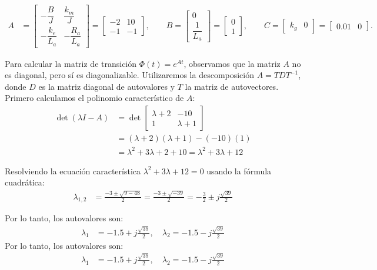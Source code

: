 \documentclass[
  11pt,
  letterpaper,
   addpoints,
  answers
  ]{exam}
\begin{document}
\begin{solution}
\begin{align}
A&=
\begin{bmatrix}
-\dfrac{B}{J} & \dfrac{k_m}{J}\\[4pt]
-\dfrac{k_e}{L_a} & -\dfrac{R_a}{L_a}
\end{bmatrix}
=
\begin{bmatrix}
-2 & 10\\
-1 & -1
\end{bmatrix},\qquad
B=
\begin{bmatrix}
0\\[2pt] \dfrac{1}{L_a}
\end{bmatrix}
=
\begin{bmatrix}
0\\ 1
\end{bmatrix},\qquad
C=\begin{bmatrix} k_g & 0\end{bmatrix}=\begin{bmatrix}0.01 & 0\end{bmatrix}.
\end{align}

Para calcular la matriz de transición $\Phi(t) = e^{At}$, observamos que la matriz $A$ no es diagonal, pero sí es diagonalizable. Utilizaremos la descomposición $A=TDT^{-1}$, donde $D$ es la matriz diagonal de autovalores y $T$ la matriz de autovectores. Primero calculamos el polinomio característico de $A$:
\begin{align}
\det(\lambda I-A) &= \det\begin{bmatrix} \lambda+2 & -10 \\ 1 & \lambda+1 \end{bmatrix} \\
&= (\lambda+2)(\lambda+1) - (-10)(1) \\
&= \lambda^2 + 3\lambda + 2 + 10 = \lambda^2+3\lambda+12
\end{align}

Resolviendo la ecuación característica $\lambda^2+3\lambda+12=0$ usando la fórmula cuadrática:
\begin{align}
\lambda_{1,2} &= \frac{-3 \pm \sqrt{9-48}}{2} = \frac{-3 \pm \sqrt{-39}}{2} = -\frac{3}{2} \pm j\frac{\sqrt{39}}{2}
\end{align}

Por lo tanto, los autovalores son:
\begin{align}
  \lambda_1 &= -1.5 + j\frac{\sqrt{39}}{2}, \quad \lambda_2 = -1.5 - j\frac{\sqrt{39}}{2}
\end{align}
Por lo tanto, los autovalores son:
\begin{align}
  \lambda_1 &= -1.5 + j\frac{\sqrt{39}}{2}, \quad \lambda_2 = -1.5 - j\frac{\sqrt{39}}{2}
\end{align}


\end{solution}
\end{document}
